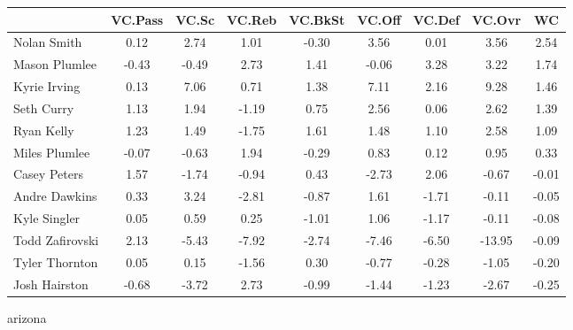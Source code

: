 \documentclass[10pt,letterpaper]{article}
\begin{document}
\begin{table}[ht]
\begin{center}
\begin{tabular}{lcccccccc}
  \hline
 & VC.Pass & VC.Sc & VC.Reb & VC.BkSt & VC.Off & VC.Def & VC.Ovr & WC \\ 
  \hline
Nolan Smith & 0.12 & 2.74 & 1.01 & -0.30 & 3.56 & 0.01 & 3.56 & 2.54 \\ 
  Mason Plumlee & -0.43 & -0.49 & 2.73 & 1.41 & -0.06 & 3.28 & 3.22 & 1.74 \\ 
  Kyrie Irving & 0.13 & 7.06 & 0.71 & 1.38 & 7.11 & 2.16 & 9.28 & 1.46 \\ 
  Seth Curry & 1.13 & 1.94 & -1.19 & 0.75 & 2.56 & 0.06 & 2.62 & 1.39 \\ 
  Ryan Kelly & 1.23 & 1.49 & -1.75 & 1.61 & 1.48 & 1.10 & 2.58 & 1.09 \\ 
  Miles Plumlee & -0.07 & -0.63 & 1.94 & -0.29 & 0.83 & 0.12 & 0.95 & 0.33 \\ 
  Casey Peters & 1.57 & -1.74 & -0.94 & 0.43 & -2.73 & 2.06 & -0.67 & -0.01 \\ 
  Andre Dawkins & 0.33 & 3.24 & -2.81 & -0.87 & 1.61 & -1.71 & -0.11 & -0.05 \\ 
  Kyle Singler & 0.05 & 0.59 & 0.25 & -1.01 & 1.06 & -1.17 & -0.11 & -0.08 \\ 
  Todd Zafirovski & 2.13 & -5.43 & -7.92 & -2.74 & -7.46 & -6.50 & -13.95 & -0.09 \\ 
  Tyler Thornton & 0.05 & 0.15 & -1.56 & 0.30 & -0.77 & -0.28 & -1.05 & -0.20 \\ 
  Josh Hairston & -0.68 & -3.72 & 2.73 & -0.99 & -1.44 & -1.23 & -2.67 & -0.25 \\ 
   \hline
\end{tabular}
\end{center}
\end{table}
\newpage
\begin{center}
arizona 
\end{center}
\end{document}
